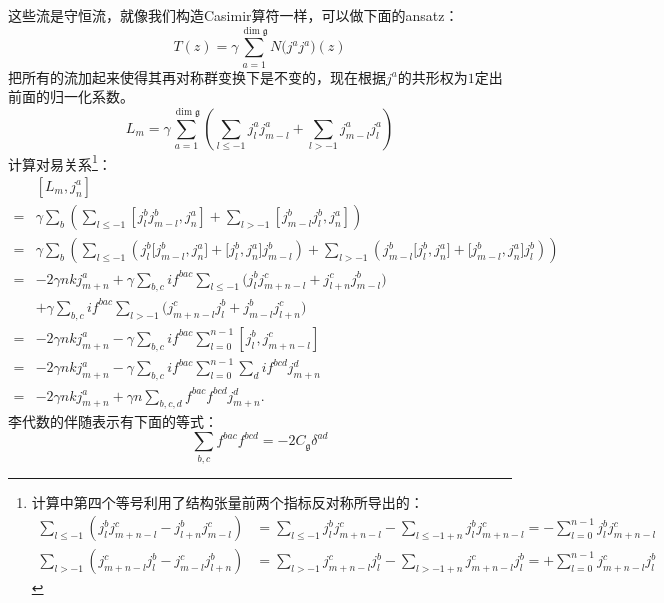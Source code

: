 这些流是守恒流，就像我们构造Casimir算符一样，可以做下面的ansatz：
\begin{equation}
	T(z)=\gamma\sum_{a=1}^{\dim\mathfrak{g}}N\bigl(j^aj^a\bigr)(z)
\end{equation}
把所有的流加起来使得其再对称群变换下是不变的，现在根据$j^a$的共形权为$1$定出前面的归一化系数。
\begin{equation}
	L_m=\gamma\sum_{a=1}^{\dim\mathfrak{g}}\left(\sum_{l\leq-1}j_l^aj_{m-l}^a+\sum_{l>-1}j_{m-l}^aj_l^a\right)
\end{equation}
计算对易关系\footnote{计算中第四个等号利用了结构张量前两个指标反对称所导出的：
\begin{equation*}
	\begin{aligned}\sum_{l\leq-1}\left(j_l^bj_{m+n-l}^c-j_{l+n}^bj_{m-l}^c\right)&=\sum_{l\leq-1}j_l^bj_{m+n-l}^c-\sum_{l\leq-1+n}j_l^bj_{m+n-l}^c=-\sum_{l=0}^{n-1}j_l^bj_{m+n-l}^c\\\sum_{l>-1}\left(j_{m+n-l}^cj_l^b-j_{m-l}^cj_{l+n}^b\right)&=\sum_{l>-1}j_{m+n-l}^cj_l^b-\sum_{l>-1+n}j_{m+n-l}^cj_l^b=+\sum_{l=0}^{n-1}j_{m+n-l}^cj_l^b\end{aligned}
	\end{equation*}}：
\begin{align*}
		&[L_m,j_n^a]\\
		=&\gamma\sum_b\left(\sum_{l\leq-1}\left[j_l^bj_{m-l}^b,j_n^a\right]+\sum_{l>-1}\left[j_{m-l}^bj_l^b,j_n^a\right]\right) \\
		=&\gamma\sum_b\left(\sum_{l\leq-1}\left(j_l^b\bigl[j_{m-l}^b,j_n^a\bigr]+\bigl[j_l^b,j_n^a\bigr]j_{m-l}^b\right)+\sum_{l>-1}\left(j_{m-l}^b\bigl[j_l^b,j_n^a\bigr]+\bigl[j_{m-l}^b,j_n^a\bigr]j_l^b\right)\right) \\
		=&-2\gamma nkj_{m+n}^{a}+\gamma\sum_{b,c}if^{bac}\sum_{l\leq-1}\big(j_{l}^{b}j_{m+n-l}^{c}+j_{l+n}^{c}j_{m-l}^{b}\big) \\
		&+\gamma\sum_{b,c}if^{bac}\sum_{l>-1}\bigl(j_{m+n-l}^{c}j_{l}^{b}+j_{m-l}^{b}j_{l+n}^{c}\bigr)\\%
		=&-2\gamma nkj_{m+n}^a-\gamma\sum_{b,c}if^{bac}\sum_{l=0}^{n-1}[j_l^b,j_{m+n-l}^c] \\
		=&-2\gamma nkj_{m+n}^a-\gamma\sum_{b,c}if^{bac}\sum_{l=0}^{n-1}\sum_dif^{bcd}j_{m+n}^d \\
		=&-2\gamma nkj_{m+n}^a+\gamma n\sum_{b,c,d}f^{bac}f^{bcd}j_{m+n}^d. 
\end{align*}
李代数的伴随表示有下面的等式：
\begin{equation}\label{38.6}
	\sum_{b,c}f^{bac}f^{bcd}=-2C_{\mathfrak{g}}\delta^{ad}
\end{equation}
